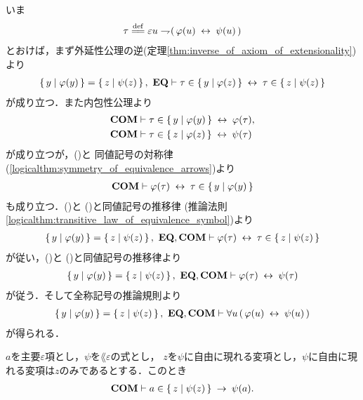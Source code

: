 	\begin{sketch}
		いま
		\begin{align}
			\tau \defeq \varepsilon u \negation (\, \varphi(u) \lrarrow \psi(u)\, )
		\end{align}
		とおけば，まず外延性公理の逆(定理\ref{thm:inverse_of_axiom_of_extensionality})より
		\begin{align}
			\left\{\, y \mid \varphi(y)\, \right\} = \left\{\, z \mid \psi(z)\, \right\},\ \mbox{{\bf EQ}} \vdash 
			\tau \in \left\{\, y \mid \varphi(z)\, \right\} \hspace{0.25em}\leftrightarrow\hspace{0.25em} \tau \in \left\{\, z \mid \psi(z)\, \right\}
			\label{fom:equivalent_formula_rewriting_5_1}
		\end{align}
		が成り立つ．また内包性公理より
		\begin{align}
			\mbox{\bf COM} &\vdash \tau \in \left\{\, y \mid \varphi(y)\, \right\} \hspace{0.25em}\leftrightarrow\hspace{0.25em} \varphi(\tau), 
			\label{fom:equivalent_formula_rewriting_5_2} \\
			\mbox{\bf COM} &\vdash \tau \in \left\{\, z \mid \varphi(z)\, \right\} \hspace{0.25em}\leftrightarrow\hspace{0.25em} \psi(\tau)
			\label{fom:equivalent_formula_rewriting_5_3}
		\end{align}
		が成り立つが，()と
		同値記号の対称律(\ref{logicalthm:symmetry_of_equivalence_arrows})より
		\begin{align}
			\mbox{\bf COM} \vdash \varphi(\tau) \hspace{0.25em}\leftrightarrow\hspace{0.25em} \tau \in \left\{\, y \mid \varphi(y)\, \right\}
			\label{fom:equivalent_formula_rewriting_5_4}
		\end{align}
		も成り立つ．()と
		()と同値記号の推移律
		(推論法則\ref{logicalthm:transitive_law_of_equivalence_symbol})より
		\begin{align}
			\left\{\, y \mid \varphi(y)\, \right\} = \left\{\, z \mid \psi(z)\, \right\},\ \mbox{{\bf EQ}},\mbox{\bf COM} \vdash
			 \varphi(\tau) \hspace{0.25em}\leftrightarrow\hspace{0.25em} \tau \in \left\{\, z \mid \psi(z)\, \right\}
			\label{fom:equivalent_formula_rewriting_5_5}
		\end{align}
		が従い，()と
		()と同値記号の推移律より
		\begin{align}
			\left\{\, y \mid \varphi(y)\, \right\} = \left\{\, z \mid \psi(z)\, \right\},\ \mbox{{\bf EQ}},\mbox{\bf COM} \vdash
			\varphi(\tau) \hspace{0.25em}\leftrightarrow\hspace{0.25em} \psi(\tau)
		\end{align}
		が従う．そして全称記号の推論規則より
		\begin{align}
			\left\{\, y \mid \varphi(y)\, \right\} = \left\{\, z \mid \psi(z)\, \right\},\ \mbox{{\bf EQ}},\mbox{\bf COM} \vdash
			\forall u\, (\, \varphi(u) \hspace{0.25em}\leftrightarrow\hspace{0.25em} \psi(u)\, )
		\end{align}
		が得られる．
		\QED
	\end{sketch}
	
	\begin{screen}
		\begin{thm}
		\label{thm:equivalent_formula_rewriting_7}
			$a$を主要$\varepsilon$項とし，$\psi$を$\lang{\varepsilon}$の式とし，
			$z$を$\psi$に自由に現れる変項とし，$\psi$に自由に現れる変項は$z$のみであるとする．このとき
			\begin{align}
				\mbox{\bf COM} \vdash a \in \left\{\, z \mid \psi(z)\, \right\} \hspace{0.25em}\rightarrow\hspace{0.25em} \psi(a).
			\end{align}
		\end{thm}
	\end{screen}
	
